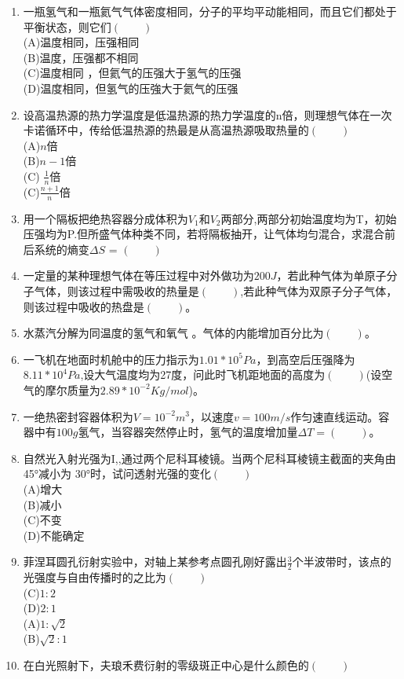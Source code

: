 \begin{enumerate}
\item 一瓶氢气和一瓶氦气气体密度相同，分子的平均平动能相同，而且它们都处于平衡状态，则它们$(\qquad)$\\
(A)温度相同，压强相同\\
(B)温度，压强都不相同\\
(C)温度相同 ，但氦气的压强大于氢气的压强\\
(D)温度相同，但氢气的压強大于氦气的压强
\item 设高温热源的热力学温度是低温热源的热力学温度的n倍，则理想气体在一次卡诺循环中，传给低温热源的热最是从高温热源吸取热量的$(\qquad)$\\
(A)$n$倍\\
(B)$n-1$倍\\
(C) $\frac{1}{n}$倍\\
(C)$\frac{n+1}{n}$倍
\item 用一个隔板把绝热容器分成体积为$V_1$和$V_2$两部分,两部分初始温度均为T，初始压强均为P.但所盛气体种类不同，若将隔板抽开，让气体均匀混合，求混合前后系统的熵变$\Delta S$ = $(\qquad)$
\item 一定量的某种理想气体在等压过程中对外做功为$200J$，若此种气体为单原子分子气体，则该过程中需吸收的热量是$(\qquad)$,若此种气体为双原子分子气体，则该过程中吸收的热盘是$(\qquad)$。
\item 水蒸汽分解为同温度的氢气和氧气 。气体的内能增加百分比为$(\qquad)$。
\item 一飞机在地面时机舱中的压力指示为$1.01*10^5 Pa$，到高空后压强降为$8.11*10^4 Pa$,设大气温度均为27度，问此时飞机距地面的高度为$(\qquad)$(设空气的摩尔质量为$2.89*10^{-2}Kg/mol$)。
\item 一绝热密封容器体积为$V=10^{-2}m^3$，以速度$v=100m/s$作匀速直线运动。容器中有$100g$氢气，当容器突然停止时，氢气的温度增加量$\Delta T=(\qquad)$。
\item 自然光入射光强为I,,通过两个尼科耳棱镜。当两个尼科耳棱镜主截面的夹角由 45°减小为 30°时，试问透射光强的变化$(\qquad)$\\
(A)增大\\
(B)减小\\
(C)不变\\
(D)不能确定
\item 菲涅耳圆孔衍射实验中，对轴上某参考点圆孔刚好露出$\frac{3}{2}$个半波带时，该点的光强度与自由传播时的之比为$(\qquad)$\\
(C)$1:2$\\
(D)$2:1$\\
(A)$1:\sqrt{2}$\\
(B)$\sqrt{2}:1$
\item 在白光照射下，夫琅禾费衍射的零级斑正中心是什么颜色的$(\qquad)$\\

\end{enumerate}
